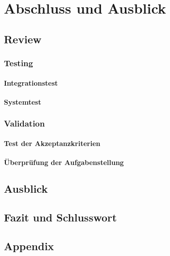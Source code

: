 \documentclass[oneside,11pt,parskip=half,ngerman]{scrreprt}
\begin{document}
\part[Teil iv]{Abschluss und Ausblick}

\chapter{Review}\label{review}

\section{Testing}\label{testing-1}

\subsection{Integrationstest}\label{integrationstest}

\subsection{Systemtest}\label{systemtest}

\section{Validation}\label{validation}

\subsection{Test der
Akzeptanzkriterien}\label{test-der-akzeptanzkriterien-1}

\subsection{Überprüfung der
Aufgabenstellung}\label{uxfcberpruxfcfung-der-aufgabenstellung-1}

\chapter{Ausblick}\label{ausblick}

\chapter{Fazit und Schlusswort}\label{fazit-und-schlusswort}

\appendix

\chapter{Appendix}\label{appendixA}
\end{document}
